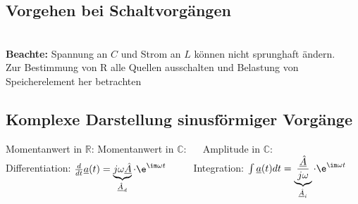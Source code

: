    		\subsection{Vorgehen bei Schaltvorgängen}
   		 $\qquad$\\
   		 \textbf{Beachte:} Spannung an $C$ und Strom an $L$ können nicht sprunghaft ändern. \\
   		 Zur Bestimmung von R alle Quellen ausschalten und Belastung von Speicherelement her betrachten 

	\subsection{Komplexe Darstellung sinusförmiger Vorgänge}
		Momentanwert in $\mathbb{R}$:  \quad
		Momentanwert in $\mathbb{C}$:  $\quad$ 
		Amplitude in $\mathbb{C}$: \\
		
		Differentiation: $\frac{d}{dt} \underline{a}(t) = \underbrace{j \omega \underline{\hat{A}}}_{\underline{\hat{A}}_d}\cdot \e^{\im \omega t}$ $\qquad$ 
		Integration: $\int \underline{a}(t) dt = \underbrace{\frac{\underline{\hat{A}}}{j \omega}}_{\underline{\hat{A}}_i}\cdot \e^{\im \omega t}$

